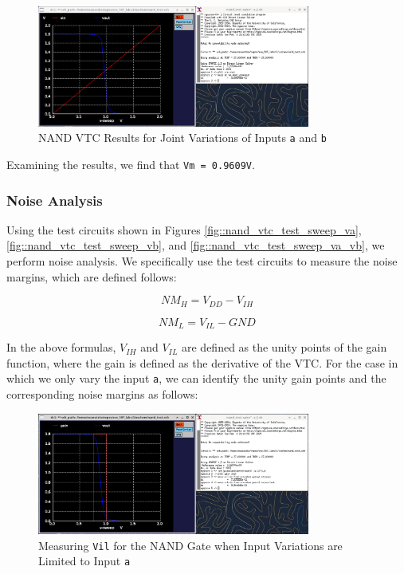 \documentclass[fleqn]{article}
\begin{document}
	\begin{figure}[H]
		\centerline{\includegraphics[width=0.8\textwidth]{nand_vtc_sweep_va_vb.png}}
		\caption{NAND VTC Results for Joint Variations of Inputs \texttt{a} and \texttt{b}}
		\label{fig::nand_vtc_sweep_va_vb}
	\end{figure}
	
	Examining the results, we find that \texttt{Vm = 0.9609V}.
	
	\subsubsection{Noise Analysis}
	\label{section::nand_noise_analysis}
	
	Using the test circuits shown in Figures \ref{fig::nand_vtc_test_sweep_va}, \ref{fig::nand_vtc_test_sweep_vb}, and \ref{fig::nand_vtc_test_sweep_va_vb}, we perform noise analysis. We specifically use the test circuits to measure the noise margins, which are defined follows:
	
	\begin{equation}
		NM_H = V_{DD} - V_{IH}
		\label{eq::noise_margin_high}
	\end{equation}
	
	\begin{equation}
		NM_L = V_{IL} - GND
		\label{eq::noise_margin_low}
	\end{equation}
	
	In the above formulas, $V_{IH}$ and $V_{IL}$ are defined as the unity points of the gain function, where the gain is defined as the derivative of the VTC. For the case in which we only vary the input \texttt{a}, we can identify the unity gain points and the corresponding noise margins as follows:
	
	\begin{figure}[H]
		\centerline{\includegraphics[width=0.8\textwidth]{nand_noise_analysis_sweep_va.png}}
		\caption{Measuring \texttt{Vil} for the NAND Gate when Input Variations are Limited to Input \texttt{a}}
		\label{fig::nand_noise_analysis_sweep_va}
	\end{figure}
	
\end{document}
